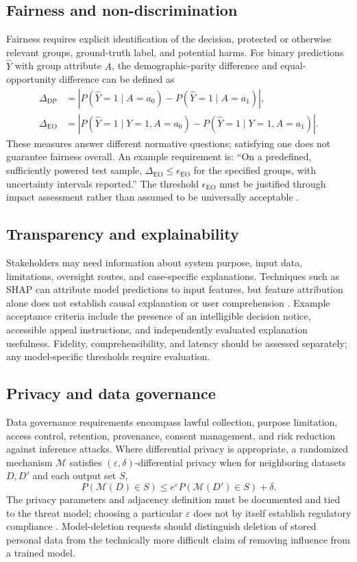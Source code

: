 \documentclass[11pt,a4paper]{article}
\begin{document}
\subsection{Fairness and non-discrimination}
Fairness requires explicit identification of the decision, protected or otherwise relevant groups, ground-truth label, and potential harms. For binary predictions $\hat Y$ with group attribute $A$, the demographic-parity difference and equal-opportunity difference can be defined as
\begin{align}
\Delta_{\mathrm{DP}}&=\left|P(\hat Y=1\mid A=a_0)-P(\hat Y=1\mid A=a_1)\right|,\\
\Delta_{\mathrm{EO}}&=\left|P(\hat Y=1\mid Y=1,A=a_0)-P(\hat Y=1\mid Y=1,A=a_1)\right|.
\end{align}
These measures answer different normative questions; satisfying one does not guarantee fairness overall. An example requirement is: ``On a predefined, sufficiently powered test sample, $\Delta_{\mathrm{EO}}\leq\epsilon_{\mathrm{EO}}$ for the specified groups, with uncertainty intervals reported.'' The threshold $\epsilon_{\mathrm{EO}}$ must be justified through impact assessment rather than assumed to be universally acceptable \cite{mehrabi2021,kleinberg2017}.

\subsection{Transparency and explainability}
Stakeholders may need information about system purpose, input data, limitations, oversight routes, and case-specific explanations. Techniques such as SHAP can attribute model predictions to input features, but feature attribution alone does not establish causal explanation or user comprehension \cite{arrieta2020,lundberg2017}. Example acceptance criteria include the presence of an intelligible decision notice, accessible appeal instructions, and independently evaluated explanation usefulness. Fidelity, comprehensibility, and latency should be assessed separately; any model-specific thresholds require evaluation.

\subsection{Privacy and data governance}
Data governance requirements encompass lawful collection, purpose limitation, access control, retention, provenance, consent management, and risk reduction against inference attacks. Where differential privacy is appropriate, a randomized mechanism $\mathcal M$ satisfies $(\varepsilon,\delta)$-differential privacy when for neighboring datasets $D,D'$ and each output set $S$,
\begin{equation}
P(\mathcal M(D)\in S)\leq e^{\varepsilon}P(\mathcal M(D')\in S)+\delta.
\end{equation}
The privacy parameters and adjacency definition must be documented and tied to the threat model; choosing a particular $\varepsilon$ does not by itself establish regulatory compliance \cite{dwork2014}. Model-deletion requests should distinguish deletion of stored personal data from the technically more difficult claim of removing influence from a trained model.
\end{document}
